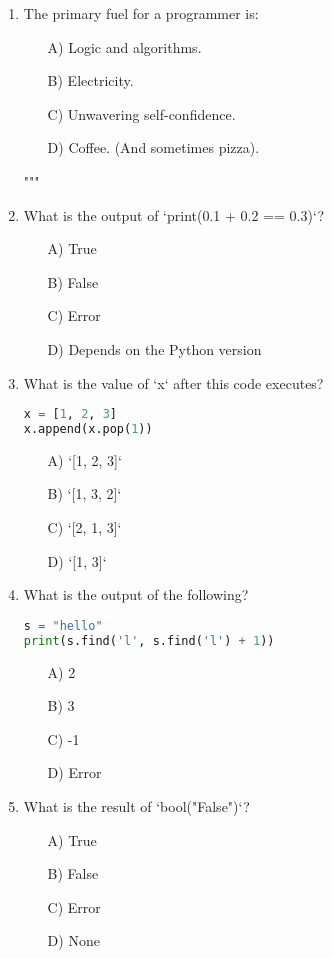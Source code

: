 \documentclass[9pt]{article}
\begin{document}
\begin{multicols}{2}
\begin{enumerate}
\item The primary fuel for a programmer is:
\begin{enumerate}
    \item[A)] Logic and algorithms.
    \item[B)] Electricity.
    \item[C)] Unwavering self-confidence.
    \item[D)] Coffee. (And sometimes pizza).
\end{enumerate}

"""\item What is the output of `print(0.1 + 0.2 == 0.3)`?
\begin{enumerate}
\item[A)] True
\item[B)] False
\item[C)] Error
\item[D)] Depends on the Python version
\end{enumerate}

\item What is the value of `x` after this code executes?
\begin{lstlisting}[language=Python]
x = [1, 2, 3]
x.append(x.pop(1))
\end{lstlisting}
\begin{enumerate}
\item[A)] `[1, 2, 3]`
\item[B)] `[1, 3, 2]`
\item[C)] `[2, 1, 3]`
\item[D)] `[1, 3]`
\end{enumerate}

\item What is the output of the following?
\begin{lstlisting}[language=Python]
s = "hello"
print(s.find('l', s.find('l') + 1))
\end{lstlisting}
\begin{enumerate}
\item[A)] 2
\item[B)] 3
\item[C)] -1
\item[D)] Error
\end{enumerate}

\item What is the result of `bool("False")`?
\begin{enumerate}
\item[A)] True
\item[B)] False
\item[C)] Error
\item[D)] None
\end{enumerate}


\end{enumerate}
\end{multicols}
\end{document}
